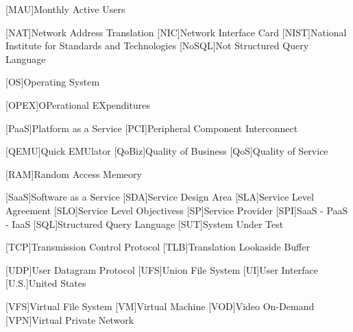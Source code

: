 [MAU]{Monthly Active Users}

[NAT]{Network Address Translation}
[NIC]{Network Interface Card}
[NIST]{National Institute for Standards and Technologies}
[NoSQL]{Not Structured Query Language}

[OS]{Operating System}

[OPEX]{OPerational EXpenditures}

[PaaS]{Platform as a Service}
[PCI]{Peripheral Component Interconnect}

[QEMU]{Quick EMUlator}
[QoBiz]{Quality of Business}
[QoS]{Quality of Service}

[RAM]{Random Access Memeory}

[SaaS]{Software as a Service}
[SDA]{Service Design Area}
[SLA]{Service Level Agreement}
[SLO]{Service Level Objectivess}
[SP]{Service Provider}
[SPI]{SaaS - PaaS - IaaS}
[SQL]{Structured Query Language}
[SUT]{System Under Test}

[TCP]{Transmission Control Protocol}
[TLB]{Translation Lookaside Buffer}

[UDP]{User Datagram Protocol}
[UFS]{Union File System}
[UI]{User Interface}
[U.S.]{United States}

[VFS]{Virtual File System}
[VM]{Virtual Machine}
[VOD]{Video On-Demand}
[VPN]{Virtual Private Network}